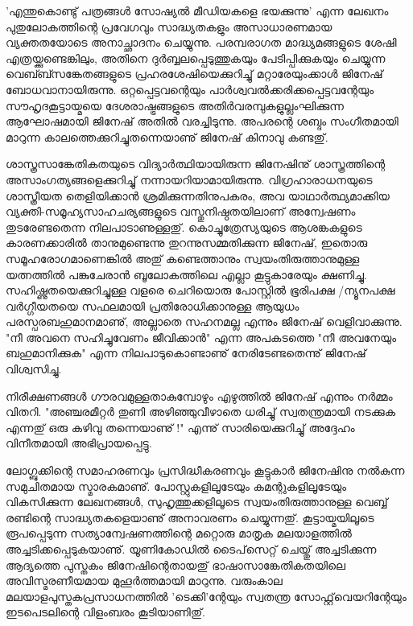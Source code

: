 'എന്തുകൊണ്ടു് പത്രങ്ങള്‍ സോഷ്യല്‍ മീഡിയകളെ ഭയക്കുന്നു' എന്ന ലേഖനം പുതുലോകത്തിന്റെ പ്രവേഗവും സാദ്ധ്യതകളും അസാധാരണമായ വ്യക്തതയോടെ അനാച്ഛാദനം ചെയ്യുന്നു. പരമ്പരാഗത മാദ്ധ്യമങ്ങളുടെ ശേഷി എത്രയ്ക്കുണ്ടെങ്കിലും, അതിനെ ദുര്‍ബ്ബലപ്പെടുത്തുകയും പേടിപ്പിക്കുകയും ചെയ്യുന്ന വെബ്ബ്സങ്കേതങ്ങളുടെ പ്രഹരശേഷിയെക്കുറിച്ചു് മറ്റാരേയുംക്കാള്‍ ജിനേഷ് ബോധവാനായിരുന്നു. ഒറ്റപ്പെട്ടവന്റെയും പാര്‍ശ്വവല്‍ക്കരിക്കപ്പെട്ടവന്റേയും സൗഹൃദകൂട്ടായ്മയെ ദേശരാഷ്ട്രങ്ങളുടെ അതിര്‍വരമ്പുകളുല്ലംഘിക്കുന്ന ആഘോഷമായി ജിനേഷ് അതില്‍ വരച്ചിടുന്നു. അപരന്റെ ശബ്ദം സംഗീതമായി മാറുന്ന കാലത്തെക്കുറിച്ചുതന്നെയാണു് ജിനേഷ് കിനാവു കണ്ടതു്.

ശാസ്ത്രസാങ്കേതികതയുടെ വിദ്യാര്‍ത്ഥിയായിരുന്ന ജിനേഷിനു് ശാസ്ത്രത്തിന്റെ അസാംഗത്യങ്ങളെക്കുറിച്ചു് നന്നായറിയാമായിരുന്നു. വിഗ്രഹാരാധനയുടെ ശാസ്ത്രീയത തെളിയിക്കാന്‍ ശ്രമിക്കുന്നതിനുപകരം, അവ യാഥാര്‍ത്ഥ്യമാക്കിയ വ്യക്തി-സമൂഹ്യസാഹചര്യങ്ങളുടെ വസ്തുനിഷ്ഠതയിലാണ് അന്വേഷണം തുടരേണ്ടതെന്ന നിലപാടാണുള്ളതു്. കൊച്ചുത്രേസ്യയുടെ ആശങ്കകളുടെ കാരണക്കാരില്‍ താനുമുണ്ടെന്നു തുറന്നുസമ്മതിക്കുന്ന ജിനേഷ്, ഇതൊരു സമൂഹരോഗമാണെങ്കില്‍ അതു് കണ്ടെത്താനും സ്വയംതിരുത്താനുമുള്ള യത്നത്തില്‍ പങ്കുചേരാന്‍ ബൂലോകത്തിലെ എല്ലാ കൂട്ടുകാരേയും ക്ഷണിച്ചു. സഹിഷ്ണുതയെക്കുറിച്ചുള്ള വളരെ ചെറിയൊരു പോസ്റ്റില്‍ ഭൂരിപക്ഷ /ന്യൂനപക്ഷ വര്‍ഗ്ഗീയതയെ സഫലമായി പ്രതിരോധിക്കാനുള്ള ആയുധം പരസ്പരബഹുമാനമാണു്, അല്ലാതെ സഹനമല്ല എന്നും ജിനേഷ് വെളിവാക്കുന്നു.  "നീ അവനെ സഹിച്ചുവേണം ജീവിക്കാന്‍" എന്ന അപകടത്തെ "നീ അവനേയും ബഹുമാനിക്കുക" എന്ന നിലപാടുകൊണ്ടാണു് നേരിടേണ്ടതെന്നു് ജിനേഷ് വിശ്വസിച്ചു.

നിരീക്ഷണങ്ങള്‍ ഗൗരവമുള്ളതാകുമ്പോഴും എഴുത്തില്‍ ജിനേഷ് എന്നും നര്‍മ്മം വിതറി. "അഞ്ചരമീറ്റര്‍ തുണി അഴിഞ്ഞുവീഴാതെ ധരിച്ചു് സ്വതന്ത്രമായി നടക്കുക എന്നതു് ഒരു കഴിവു തന്നെയാണു് !" എന്നു് സാരിയെക്കുറിച്ചു് അദ്ദേഹം വിനീതമായി അഭിപ്രായപ്പെട്ടു.

ലോഗ്ബുക്കിന്റെ സമാഹരണവും പ്രസിദ്ധീകരണവും കൂട്ടുകാര്‍ ജിനേഷിനു നല്‍കുന്ന സമുചിതമായ സ്മാരകമാണു്. പോസ്റ്റുകളിലൂടേയും കമന്റുകളിലൂടേയും വികസിക്കുന്ന ലേഖനങ്ങള്‍, സുഹൃത്തുക്കളിലൂടെ സ്വയംതിരുത്താനുള്ള വെബ്ബ് രണ്ടിന്റെ സാദ്ധ്യതകളെയാണു് അനാവരണം ചെയ്യുന്നതു്. കൂട്ടായ്മയിലൂടെ രൂപപ്പെടുന്ന സത്യാന്വേഷണത്തിന്റെ മറ്റൊരു മാതൃക മലയാളത്തില്‍ അച്ചടിക്കപ്പെടുകയാണു്. യൂണികോഡില്‍ ടൈപ്‌സെറ്റ് ചെയ്തു് അച്ചടിക്കുന്ന ആദ്യത്തെ പുസ്തകം ജിനേഷിന്റെതായതു് ഭാഷാസാങ്കേതികതയിലെ അവിസ്മരണീയമായ മുഹൂര്‍ത്തമായി മാറുന്നു. വരുംകാല മലയാളപുസ്തകപ്രസാധനത്തില്‍ 'ടെക്കി'ന്റേയും സ്വതന്ത്ര സോഫ്റ്റ്‌വെയറിന്റേയും ഇടപെടലിന്റെ വിളംബരം കൂടിയാണിതു്. 


